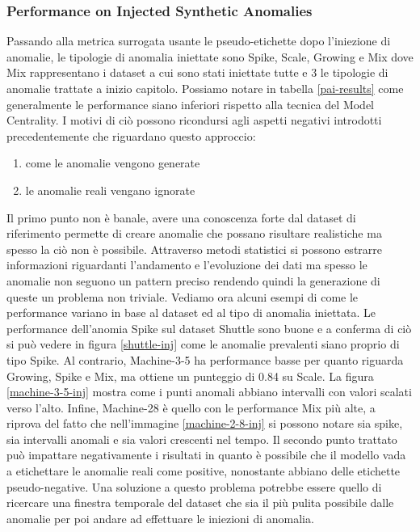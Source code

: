 \newpage
\subsubsection{Performance on Injected Synthetic Anomalies}
Passando alla metrica surrogata usante le pseudo-etichette dopo l'iniezione di anomalie, le tipologie di anomalia iniettate sono Spike, Scale, Growing e Mix dove Mix rappresentano i dataset a cui sono stati iniettate tutte e 3 le tipologie di anomalie trattate a inizio capitolo. Possiamo notare in tabella \ref{pai-results} come generalmente le performance siano inferiori rispetto alla tecnica del Model Centrality. I motivi di ciò possono ricondursi agli aspetti negativi introdotti precedentemente che riguardano questo approccio: 
\begin{enumerate}
	\item come le anomalie vengono generate
	\item le anomalie reali vengano ignorate
\end{enumerate}
Il primo punto non è banale, avere una conoscenza forte dal dataset di riferimento permette di creare anomalie che possano risultare realistiche ma spesso la ciò non è possibile. Attraverso metodi statistici si possono estrarre informazioni riguardanti l'andamento e l'evoluzione dei dati ma spesso le anomalie non seguono un pattern preciso rendendo quindi la generazione di queste un problema non triviale. 
Vediamo ora alcuni esempi di come le performance variano in base al dataset ed al tipo di anomalia iniettata. Le performance dell'anomia Spike sul dataset Shuttle sono buone e a conferma di ciò si può vedere in figura \ref{shuttle-inj} come le anomalie prevalenti siano proprio di tipo Spike.
Al contrario, Machine-3-5 ha performance basse per quanto riguarda Growing, Spike e Mix, ma ottiene un punteggio di 0.84 su Scale. La figura \ref{machine-3-5-inj} mostra come i punti anomali abbiano intervalli con valori scalati verso l'alto. Infine, Machine-28 è quello con le performance Mix più alte, a riprova del fatto che nell'immagine \ref{machine-2-8-inj} si possono notare sia spike, sia intervalli anomali e sia valori crescenti nel tempo.
Il secondo punto trattato può impattare negativamente i risultati in quanto è possibile che il modello vada a etichettare le anomalie reali come positive, nonostante abbiano delle etichette pseudo-negative. Una soluzione a questo problema potrebbe essere quello di ricercare una finestra temporale del dataset che sia il più pulita possibile dalle anomalie per poi andare ad effettuare le iniezioni di anomalia.
